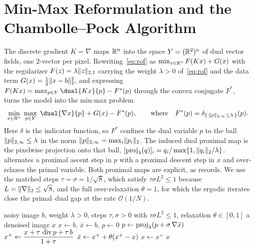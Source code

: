 \documentclass{article}
\begin{document}
\section{Min-Max Reformulation and the Chambolle--Pock Algorithm}
\label{section:algorithm}
The discrete gradient $K = \nabla$ maps $\mathbb{R}^n$ into the space $Y = (\mathbb{R}^2)^n$ of dual vector fields, one $2$-vector per pixel.
Rewriting~\eqref{eq:rof} as $\min_{x \in \mathbb{R}^n} F(K x) + G(x)$ with the regularizer $F(z) = \lambda \lVert z\rVert_{2,1}$ carrying the weight $\lambda > 0$ of~\eqref{eq:rof} and the data term $G(x) = \tfrac12 \lVert x - b\rVert_2^2$, and expressing $F(K x) = \max_{p \in Y} \dual{K x}{p} - F^*(p)$ through the convex conjugate $F^*$, turns the model into the min-max problem
\begin{equation}
	\label{eq:minmax}
	\min_{x \in \R^n} \; \max_{p \in Y} \; \dual{\nabla x}{p} + G(x) - F^*(p),
	\qquad
	\text{where}
	\quad
	F^*(p) = \delta_{\{\, \norm{p}_{2,\infty} \le \lambda \,\}}(p).
\end{equation}
Here $\delta$ is the indicator function, so $F^*$ confines the dual variable $p$ to the ball $\lVert p\rVert_{2,\infty} \le \lambda$ in the norm $\lVert p\rVert_{2,\infty} = \max_i \lVert p_i\rVert_2$.
The induced dual proximal map is the pixelwise projection onto that ball, $[\operatorname{proj}_\lambda(q)]_i = q_i / \max\{1, \lVert q_i\rVert_2 / \lambda\}$.
 alternates a proximal ascent step in $p$ with a proximal descent step in $x$ and over-relaxes the primal variable.
Both proximal maps are explicit, as  records.
We use the matched steps $\tau = \sigma = 1/\sqrt{8}$, which satisfy $\tau \sigma L^2 \le 1$ because $L = \lVert\nabla\rVert_2 \le \sqrt{8}$, and the full over-relaxation $\theta = 1$, for which the ergodic iterates close the primal--dual gap at the rate $\mathcal{O}(1/N)$.

\begin{algorithm}[htbp]
	\caption{Chambolle--Pock for the ROF denoising model~\eqref{eq:rof}.}
	\label{algorithm:cp}
	\begin{algorithmic}[1]
		\Require noisy image $b$, weight $\lambda > 0$, steps $\tau, \sigma > 0$ with $\tau \sigma L^2 \le 1$, relaxation $\theta \in [0, 1]$
		\Ensure a denoised image $x$
		\State $x \gets b$, \enspace $\bar{x} \gets b$, \enspace $p \gets 0$
			\State $p \gets \proj_\lambda\paren*{p + \sigma \, \nabla \bar{x}}$
			\State $x^{+} \gets \dfrac{x + \tau \, \operatorname{div} p + \tau \, b}{1 + \tau}$
			\State $\bar{x} \gets x^{+} + \theta \paren*{x^{+} - x}$
			\State $x \gets x^{+}$
		\EndWhile
		\State \Return $x$
	\end{algorithmic}
\end{algorithm}
\end{document}
